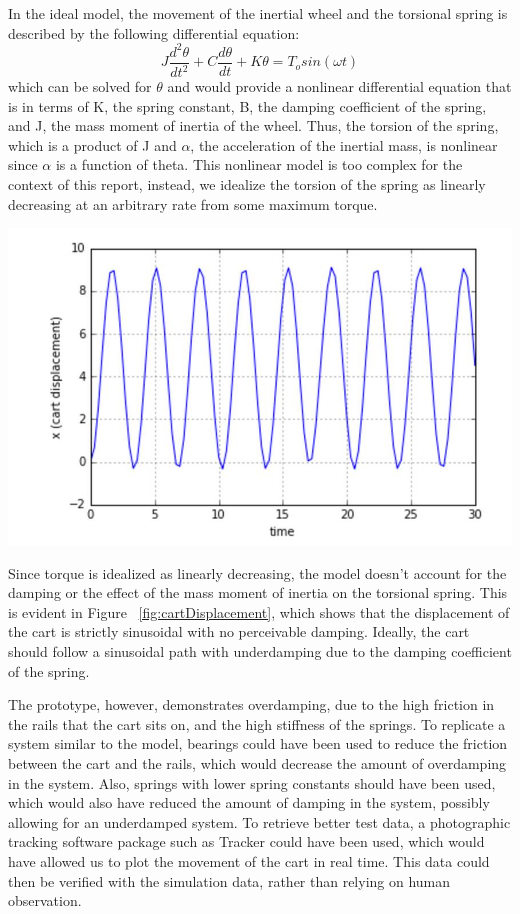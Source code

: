 \documentclass[notitlepage,10pt]{report}
\newenvironment{Figure}
  {\par\medskip\noindent\minipage{\linewidth}}
  {\endminipage\par\medskip}
\begin{document}
\begin{multicols}{2}
In the ideal model, the movement of the inertial wheel and the torsional spring is described by the following differential equation: 
\begin{equation}
   J\frac{d^2\theta}{dt^2} + C\frac{d\theta}{dt} + K\theta = T_osin(\omega t)
\end{equation}
which can be solved for $\theta$ and would provide a nonlinear differential equation that is in terms of K, the spring constant, B, the damping coefficient of the spring, and J, the mass moment of inertia of the wheel. Thus, the torsion of the spring, which is a product of J and $\alpha$, the acceleration of the inertial mass, is nonlinear since $\alpha$ is a function of theta. This nonlinear model is too complex for the context of this report, instead, we idealize the torsion of the spring as linearly decreasing at an arbitrary rate from some maximum torque. 
\begin{Figure}
 \centering
   \includegraphics[width=\linewidth]{displacement}
   \label{fig:cartDisplacement}
\end{Figure} 
Since torque is idealized as linearly decreasing, the model doesn’t account for the damping or the effect of the mass moment of inertia on the torsional spring. This is evident in Figure ~\ref{fig:cartDisplacement}, which shows that the displacement of the cart is strictly sinusoidal with no perceivable damping. Ideally, the cart should follow a sinusoidal path with underdamping due to the damping coefficient of the spring.

The prototype, however, demonstrates overdamping, due to the high friction in the rails that the cart sits on, and the high stiffness of the springs. To replicate a system similar to the model, bearings could have been used to reduce the friction between the cart and the rails, which would decrease the amount of overdamping in the system. Also, springs with lower spring constants should have been used, which would also have reduced the amount of damping in the system, possibly allowing for an underdamped system. To retrieve better test data, a photographic tracking software package such as Tracker could have been used, which would have allowed us to plot the movement of the cart in real time. This data could then be verified with the simulation data, rather than relying on human observation.


\end{multicols}
\end{document}
